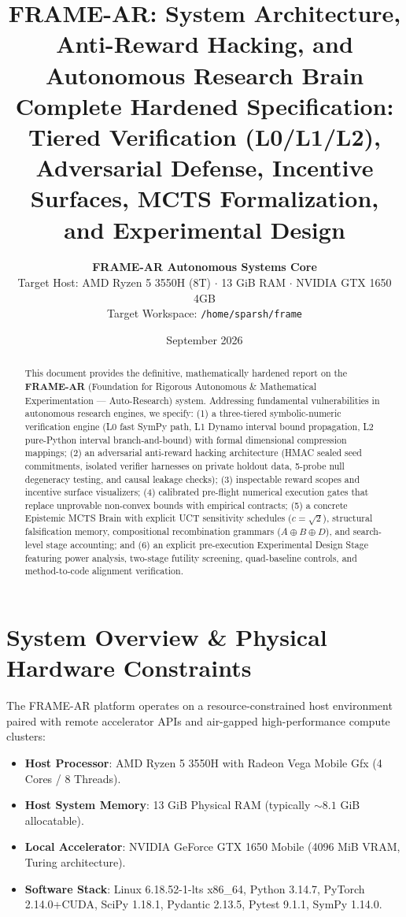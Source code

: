 \documentclass[11pt,a4paper]{article}
\title{\textbf{\LARGE FRAME-AR: System Architecture, Anti-Reward Hacking, and Autonomous Research Brain}\\[0.4em]
\large Complete Hardened Specification: Tiered Verification (L0/L1/L2), Adversarial Defense, Incentive Surfaces, MCTS Formalization, and Experimental Design}
\author{\textbf{FRAME-AR Autonomous Systems Core} \\
Target Host: AMD Ryzen 5 3550H (8T) $\cdot$ 13 GiB RAM $\cdot$ NVIDIA GTX 1650 4GB \\
Target Workspace: \texttt{/home/sparsh/frame}}
\date{September 2026}
\begin{document}
\maketitle

\begin{abstract}
This document provides the definitive, mathematically hardened report on the \textbf{FRAME-AR} (Foundation for Rigorous Autonomous \& Mathematical Experimentation --- Auto-Research) system. Addressing fundamental vulnerabilities in autonomous research engines, we specify: (1) a three-tiered symbolic-numeric verification engine (L0 fast SymPy path, L1 Dynamo interval bound propagation, L2 pure-Python interval branch-and-bound) with formal dimensional compression mappings; (2) an adversarial anti-reward hacking architecture (HMAC sealed seed commitments, isolated verifier harnesses on private holdout data, 5-probe null degeneracy testing, and causal leakage checks); (3) inspectable reward scopes and incentive surface visualizers; (4) calibrated pre-flight numerical execution gates that replace unprovable non-convex bounds with empirical contracts; (5) a concrete Epistemic MCTS Brain with explicit UCT sensitivity schedules ($c=\sqrt{2}$), structural falsification memory, compositional recombination grammars ($A \oplus B \oplus D$), and search-level stage accounting; and (6) an explicit pre-execution Experimental Design Stage featuring power analysis, two-stage futility screening, quad-baseline controls, and method-to-code alignment verification.
\end{abstract}

\tableofcontents
\newpage

\section{System Overview \& Physical Hardware Constraints}

The FRAME-AR platform operates on a resource-constrained host environment paired with remote accelerator APIs and air-gapped high-performance compute clusters:
\begin{itemize}[noitemsep]
    \item \textbf{Host Processor}: AMD Ryzen 5 3550H with Radeon Vega Mobile Gfx (4 Cores / 8 Threads).
    \item \textbf{Host System Memory}: 13 GiB Physical RAM (typically $\sim 8.1$ GiB allocatable).
    \item \textbf{Local Accelerator}: NVIDIA GeForce GTX 1650 Mobile (4096 MiB VRAM, Turing architecture).
    \item \textbf{Software Stack}: Linux 6.18.52-1-lts x86\_64, Python 3.14.7, PyTorch 2.14.0+CUDA, SciPy 1.18.1, Pydantic 2.13.5, Pytest 9.1.1, SymPy 1.14.0.
\end{itemize}
\end{document}
